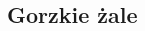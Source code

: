 \documentclass[wide,landscape,a4paper,10pt]{mwart}
\begin{document}
\setlength{\columnseprule}{0.1pt}
\footnotesize 
\pagestyle{empty}
\begin{multicols}{4}
	
\section{Gorzkie żale}







\end{multicols}
\end{document}
